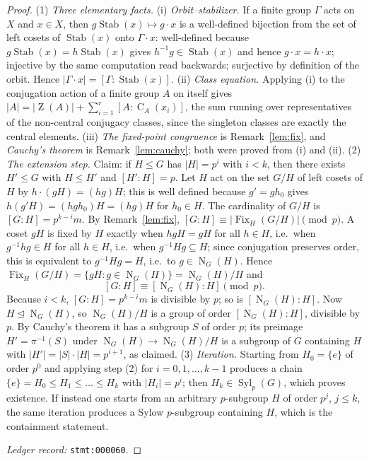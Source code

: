 \documentclass[11pt]{article}
\theoremstyle{definition}
\theoremstyle{remark}
\newcommand{\Syl}{\operatorname{Syl}}
\newcommand{\Fix}{\operatorname{Fix}}
\newcommand{\Stab}{\operatorname{Stab}}
\newcommand{\Cent}{\operatorname{C}}
\newcommand{\Norm}{\operatorname{N}}
\newcommand{\Z}{\operatorname{Z}}
\begin{document}
\begin{proof}
(1) \emph{Three elementary facts.} (i) \emph{Orbit--stabilizer.} If a finite group $\Gamma$ acts on $X$ and $x\in X$, then $g\Stab(x)\mapsto g\cdot x$ is a well-defined bijection from the set of left cosets of $\Stab(x)$ onto $\Gamma\cdot x$: well-defined because $g\Stab(x)=h\Stab(x)$ gives $h^{-1}g\in\Stab(x)$ and hence $g\cdot x=h\cdot x$; injective by the same computation read backwards; surjective by definition of the orbit. Hence $|\Gamma\cdot x|=[\Gamma:\Stab(x)]$. (ii) \emph{Class equation.} Applying (i) to the conjugation action of a finite group $A$ on itself gives $|A|=|\Z(A)|+\sum_{i=1}^{r}[A:\Cent_A(x_i)]$, the sum running over representatives of the non-central conjugacy classes, since the singleton classes are exactly the central elements. (iii) \emph{The fixed-point congruence} is Remark~\ref{lem:fix}, and \emph{Cauchy's theorem} is Remark~\ref{lem:cauchy}; both were proved from (i) and (ii).
(2) \emph{The extension step.} Claim: if $H\le G$ has $|H|=p^{i}$ with $i<k$, then there exists $H'\le G$ with $H\le H'$ and $[H':H]=p$. Let $H$ act on the set $G/H$ of left cosets of $H$ by $h\cdot(gH)=(hg)H$; this is well defined because $g'=gh_{0}$ gives $h(g'H)=(hgh_{0})H=(hg)H$ for $h_{0}\in H$. The cardinality of $G/H$ is $[G:H]=p^{k-i}m$. By Remark~\ref{lem:fix}, $[G:H]\equiv|\Fix_H(G/H)|\pmod p$. A coset $gH$ is fixed by $H$ exactly when $hgH=gH$ for all $h\in H$, i.e.\ when $g^{-1}hg\in H$ for all $h\in H$, i.e.\ when $g^{-1}Hg\subseteq H$; since conjugation preserves order, this is equivalent to $g^{-1}Hg=H$, i.e.\ to $g\in\Norm_G(H)$. Hence $\Fix_H(G/H)=\{gH: g\in\Norm_G(H)\}=\Norm_G(H)/H$ and
\[
[G:H]\equiv[\Norm_G(H):H]\pmod p .
\]
Because $i<k$, $[G:H]=p^{k-i}m$ is divisible by $p$; so is $[\Norm_G(H):H]$. Now $H\trianglelefteq\Norm_G(H)$, so $\Norm_G(H)/H$ is a group of order $[\Norm_G(H):H]$, divisible by $p$. By Cauchy's theorem it has a subgroup $S$ of order $p$; its preimage $H'=\pi^{-1}(S)$ under $\Norm_G(H)\to\Norm_G(H)/H$ is a subgroup of $G$ containing $H$ with $|H'|=|S|\cdot|H|=p^{i+1}$, as claimed.
(3) \emph{Iteration.} Starting from $H_{0}=\{e\}$ of order $p^{0}$ and applying step (2) for $i=0,1,\dots,k-1$ produces a chain $\{e\}=H_{0}\le H_{1}\le\dots\le H_{k}$ with $|H_{i}|=p^{i}$; then $H_{k}\in\Syl_p(G)$, which proves existence. If instead one starts from an arbitrary $p$-subgroup $H$ of order $p^{j}$, $j\le k$, the same iteration produces a Sylow $p$-subgroup containing $H$, which is the containment statement.

\emph{Ledger record:} \texttt{stmt:000060}.
\end{proof}
\end{document}

